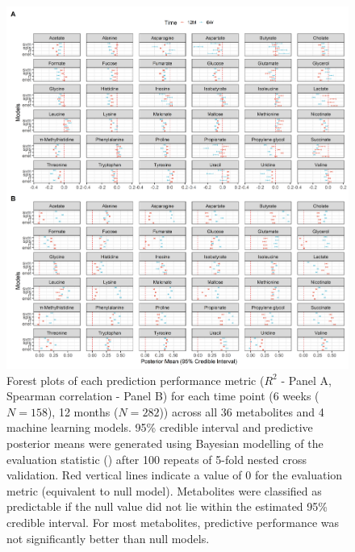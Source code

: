 \begin{figure}[!ht]
    \centering
    \includegraphics[width=\linewidth]{figures/ch2_f4.png}
    \caption[Forest plots of each prediction performance metric ($R^2$ - Panel A, Spearman correlation - Panel B) for each time point (6 weeks ($N = 158$), 12 months ($N = 282$)) across all 36 metabolites and 4 machine learning models]{Forest plots of each prediction performance metric ($R^2$ - Panel A, Spearman correlation - Panel B) for each time point (6 weeks ($N = 158$), 12 months ($N = 282$)) across all 36 metabolites and 4 machine learning models. 95\% credible interval and predictive posterior means were generated using Bayesian modelling of the evaluation statistic () after 100 repeats of 5-fold nested cross validation. Red vertical lines indicate a value of 0 for the evaluation metric (equivalent to null model). Metabolites were classified as predictable if the null value did not lie within the estimated 95\% credible interval. For most metabolites, predictive performance was not significantly better than null models.}
    \label{fig:2.4}
\end{figure}

